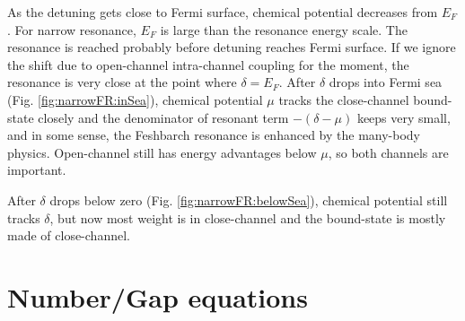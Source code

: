 \documentclass{article}
\begin{document}
As the detuning gets close to Fermi surface, chemical potential decreases from $E_{F}$. For narrow resonance, $E_{F}$ is large than the resonance energy scale.  The resonance is reached probably before detuning reaches Fermi surface.  If we ignore the shift due to open-channel intra-channel coupling for the moment, the resonance is very close at the point where $\delta=E_{F}$.  After $\delta$ drops into Fermi sea (Fig. \ref{fig:narrowFR:inSea}), chemical potential $\mu$ tracks the close-channel bound-state closely and the denominator of resonant term $-(\delta-\mu)$ keeps very small, and in some sense, the Feshbarch resonance is enhanced by the many-body  physics.  Open-channel still has energy advantages below $\mu$, so both channels are important.  

After $\delta$ drops below zero (Fig. \ref{fig:narrowFR:belowSea}), chemical potential still tracks $\delta$, but now most weight is in close-channel and the bound-state is mostly made of close-channel.  


\section{Number/Gap equations}



\end{document}
